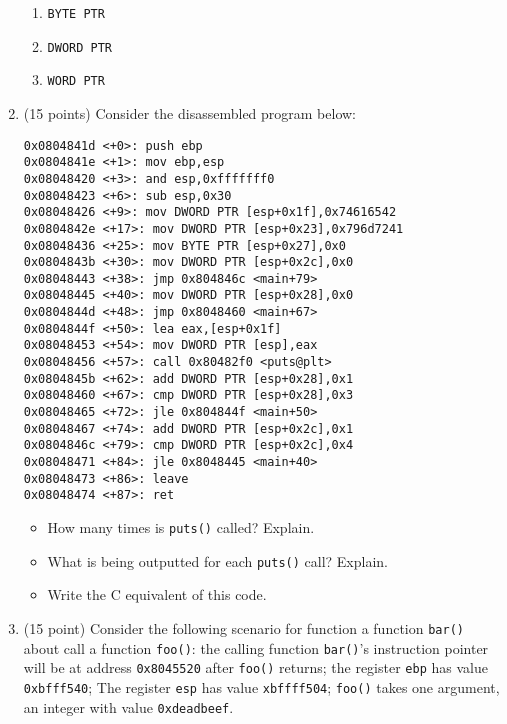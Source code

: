 \documentclass{article}[9pt]
\begin{document}
\begin{enumerate}
\begin{enumerate}
\item \texttt{BYTE PTR}

\item \texttt{DWORD PTR}

\item \texttt{WORD PTR}
\end{enumerate}

\item (15 points) Consider the disassembled program below:

\begin{verbatim}
0x0804841d <+0>: push ebp
0x0804841e <+1>: mov ebp,esp
0x08048420 <+3>: and esp,0xfffffff0
0x08048423 <+6>: sub esp,0x30
0x08048426 <+9>: mov DWORD PTR [esp+0x1f],0x74616542
0x0804842e <+17>: mov DWORD PTR [esp+0x23],0x796d7241
0x08048436 <+25>: mov BYTE PTR [esp+0x27],0x0
0x0804843b <+30>: mov DWORD PTR [esp+0x2c],0x0
0x08048443 <+38>: jmp 0x804846c <main+79>
0x08048445 <+40>: mov DWORD PTR [esp+0x28],0x0
0x0804844d <+48>: jmp 0x8048460 <main+67>
0x0804844f <+50>: lea eax,[esp+0x1f]
0x08048453 <+54>: mov DWORD PTR [esp],eax
0x08048456 <+57>: call 0x80482f0 <puts@plt>
0x0804845b <+62>: add DWORD PTR [esp+0x28],0x1
0x08048460 <+67>: cmp DWORD PTR [esp+0x28],0x3
0x08048465 <+72>: jle 0x804844f <main+50>
0x08048467 <+74>: add DWORD PTR [esp+0x2c],0x1
0x0804846c <+79>: cmp DWORD PTR [esp+0x2c],0x4
0x08048471 <+84>: jle 0x8048445 <main+40>
0x08048473 <+86>: leave
0x08048474 <+87>: ret 
\end{verbatim}

\begin{itemize}
\item How many times is \texttt{puts()} called? Explain.

\item What is being outputted for each \texttt{puts()} call? Explain.

\item Write the C equivalent of this code.
\end{itemize}

\item (15 point) Consider the following scenario for function a function \texttt{bar()}
about call a function \texttt{foo()}: the calling function \texttt{bar()}'s
instruction pointer will be at address \texttt{0x8045520} after \texttt{foo()}
returns; the register \texttt{ebp} has value \texttt{0xbfff540}; The register
\texttt{esp} has value \texttt{xbffff504}; \texttt{foo()} takes one argument, an
integer with value \texttt{0xdeadbeef}.


\end{enumerate}
\end{document}
